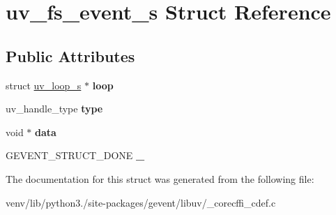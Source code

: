 \hypertarget{structuv__fs__event__s}{}\section{uv\+\_\+fs\+\_\+event\+\_\+s Struct Reference}
\label{structuv__fs__event__s}
\subsection*{Public Attributes}
\begin{DoxyCompactItemize}
\item 
\mbox{\label{structuv__fs__event__s_a3e7a150c2cd54a1e7f06f9382b6af84f}} 
struct \hyperlink{structuv__loop__s}{uv\+\_\+loop\+\_\+s} $\ast$ {\bfseries loop}
\item 
\mbox{\label{structuv__fs__event__s_a4b5634e8b9587e5821c25855ddb18b8b}} 
uv\+\_\+handle\+\_\+type {\bfseries type}
\item 
\mbox{\label{structuv__fs__event__s_ad9aa6552d32a9aa2991abbd1d33f27ed}} 
void $\ast$ {\bfseries data}
\item 
\mbox{\label{structuv__fs__event__s_a0e205cb4f8b442c242988150dcf69ffa}} 
G\+E\+V\+E\+N\+T\+\_\+\+S\+T\+R\+U\+C\+T\+\_\+\+D\+O\+NE {\bfseries \+\_\+}
\end{DoxyCompactItemize}


The documentation for this struct was generated from the following file\+:\begin{DoxyCompactItemize}
\item 
venv/lib/python3./site-\/packages/gevent/libuv/\+\_\+corecffi\+\_\+cdef.\+c\end{DoxyCompactItemize}
